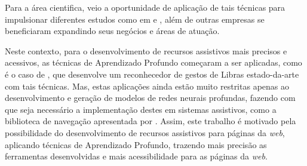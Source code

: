 \par Para a área cientifica, veio a oportunidade de aplicação de tais técnicas para impulsionar diferentes estudos como em  e , além de outras empresas se beneficiaram expandindo seus negócios e áreas de atuação.

\par Neste contexto, para o desenvolvimento de recursos assistivos mais precisos e acessivos, as técnicas de Aprendizado Profundo começaram a ser aplicadas, como é o caso de , que desenvolve um reconhecedor de gestos de Libras estado-da-arte com tais técnicas. Mas, estas aplicações ainda estão muito restritas apenas ao desenvolvimento e geração de modelos de redes neurais profundas, fazendo com que seja necessário a implementação destes em sistemas assistivos, como a biblioteca de navegação apresentada por \cite{handsfree2019}. Assim, este trabalho é motivado pela possibilidade do desenvolvimento de recursos assistivos para páginas da \textit{web}, aplicando técnicas de Aprendizado Profundo, trazendo mais precisão as ferramentas desenvolvidas e mais acessibilidade para as páginas da \textit{web}.












